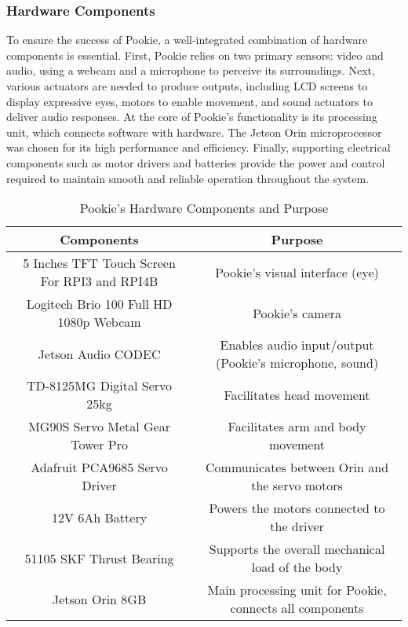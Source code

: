 \subsubsection{Hardware Components}
To ensure the success of Pookie, a well-integrated combination of hardware components is essential. First, Pookie relies on two primary sensors: video and audio, using a webcam and a microphone to perceive its surroundings. Next, various actuators are needed to produce outputs, including LCD screens to display expressive eyes, motors to enable movement, and sound actuators to deliver audio responses. At the core of Pookie’s functionality is its processing unit, which connects software with hardware. The Jetson Orin microprocessor was chosen for its high performance and efficiency. Finally, supporting electrical components such as motor drivers and batteries provide the power and control required to maintain smooth and reliable operation throughout the system.

\begin{table}[h]
    \begin{center}
    \begin{tabular}{|c|c|}
        \hline
        \textbf{Components} & \textbf{Purpose} \\
        \hline
        5 Inches TFT Touch Screen For RPI3 and RPI4B & Pookie’s visual interface (eye)   \\
        \hline
        Logitech Brio 100 Full HD 1080p Webcam     & Pookie’s camera     \\
        \hline
        Jetson Audio CODEC & Enables audio input/output (Pookie’s microphone, sound) \\
        \hline
        TD-8125MG Digital Servo 25kg   & Facilitates head movement   \\
        \hline
        MG90S Servo Metal Gear Tower Pro   & Facilitates arm and body movement \\
        \hline
        Adafruit PCA9685 Servo Driver      &  Communicates between Orin and the servo motors   \\
        \hline
        12V 6Ah Battery  & Powers the motors connected to the driver   \\
        \hline
        51105 SKF Thrust Bearing &  Supports the overall mechanical load of the body \\
        \hline
        Jetson Orin 8GB &  Main processing unit for Pookie, connects all components \\
        \hline
    \end{tabular}
    \end{center}
    \captionsetup{justification=centering}
    \caption{Pookie’s Hardware Components and Purpose}
    \label{tab:16-hardware}
\end{table}

